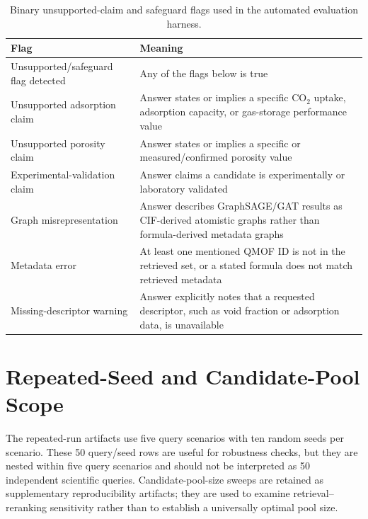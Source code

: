 \documentclass[12pt,a4paper]{article}
\begin{document}
\begin{table}[H]
\centering
\caption{Binary unsupported-claim and safeguard flags used in the automated evaluation harness.}
\small
\setlength{\tabcolsep}{4pt}
\begin{tabular}{p{4.0cm} p{10.0cm}}
\toprule
\textbf{Flag} & \textbf{Meaning}\\
\midrule
Unsupported/safeguard flag detected & Any of the flags below is true\\
Unsupported adsorption claim & Answer states or implies a specific CO$_2$ uptake, adsorption capacity, or gas-storage performance value\\
Unsupported porosity claim & Answer states or implies a specific or measured/confirmed porosity value\\
Experimental-validation claim & Answer claims a candidate is experimentally or laboratory validated\\
Graph misrepresentation & Answer describes GraphSAGE/GAT results as CIF-derived atomistic graphs rather than formula-derived metadata graphs\\
Metadata error & At least one mentioned QMOF ID is not in the retrieved set, or a stated formula does not match retrieved metadata\\
Missing-descriptor warning & Answer explicitly notes that a requested descriptor, such as void fraction or adsorption data, is unavailable\\
\bottomrule
\end{tabular}
\end{table}

\section*{Repeated-Seed and Candidate-Pool Scope}

The repeated-run artifacts use five query scenarios with ten random seeds per scenario. These 50 query/seed rows are useful for robustness checks, but they are nested within five query scenarios and should not be interpreted as 50 independent scientific queries. Candidate-pool-size sweeps are retained as supplementary reproducibility artifacts; they are used to examine retrieval--reranking sensitivity rather than to establish a universally optimal pool size.
\end{document}
